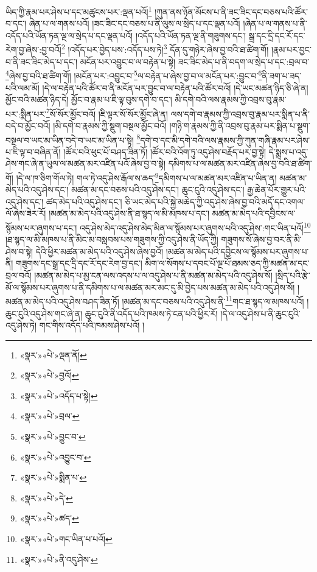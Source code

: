 ཡིད་ཀྱི་རྣམ་པར་ཤེས་པ་དང་མཚུངས་པར་:ལྡན་པའོ།\footnote{«སྣར་»«པེ་»ལྡན་ནོ།} །ཀུན་ནས་ཉོན་མོངས་པ་ནི་ཟང་ཟིང་དང་བཅས་པའི་ཚོར་བ་དང་། ཞེན་པ་ལ་གནས་པའོ། །ཟང་ཟིང་དང་བཅས་པ་ནི་ལུས་ལ་སྲེད་པ་དང་ལྡན་པའོ། །ཞེན་པ་ལ་གནས་པ་ནི་འདོད་པའི་ཡོན་ཏན་ལྔ་ལ་སྲེད་པ་དང་ལྡན་པའོ། །འདོད་པའི་ཡོན་ཏན་ལྔ་ནི་གཟུགས་དང་། སྒྲ་དང་དྲི་དང་རོ་དང་རེག་བྱ་ཞེས་:བྱ་བའོ།\footnote{«སྣར་»«པེ་»བྱའོ།} །འདོད་པར་བྱེད་པས་:འདོད་པས་ཏེ།\footnote{«སྣར་»«པེ་»འདོད་པ་སྟེ།} དོན་དུ་གཉེར་ཞེས་བྱ་བའི་ཐ་ཚིག་གོ། །རྣམ་པར་བྱང་བ་ནི་ཟང་ཟིང་མེད་པ་དང་། མངོན་པར་འབྱུང་བ་ལ་བརྟེན་པ་སྟེ། ཟང་ཟིང་མེད་པ་ནི་བདག་ལ་སྲེད་པ་དང་:བྲལ་བ་\footnote{«སྣར་»«པེ་»བྲལ་}ཞེས་བྱ་བའི་ཐ་ཚིག་གོ། །མངོན་པར་:འབྱུང་བ་\footnote{«སྣར་»«པེ་»བྱུང་བ་}ལ་བརྟེན་པ་ཞེས་བྱ་བ་ལ་མངོན་པར་:བྱུང་བ་\footnote{«སྣར་»«པེ་»འབྱུང་བ་}ནི་ཟག་པ་ཟད་པའི་ལམ་མོ། །དེ་ལ་བརྟེན་པའི་ཚོར་བ་ནི་མངོན་པར་བྱུང་བ་ལ་བརྟེན་པའི་ཚོར་བའོ། །དེ་ཡང་མཚན་ཉིད་ཅི་ཞེ་ན། མྱོང་བའི་མཚན་ཉིད་དེ། མྱོང་བ་རྣམ་པ་ཇི་ལྟ་བུས་དགེ་བ་དང་། མི་དགེ་བའི་ལས་རྣམས་ཀྱི་འབྲས་བུ་རྣམ་པར་:སྨིན་པར་\footnote{«སྣར་»«པེ་»སྨིན་པ་}སོ་སོར་མྱོང་བའོ། །ཇི་ལྟར་སོ་སོར་མྱོང་ཞེ་ན། ལས་དགེ་བ་རྣམས་ཀྱི་འབྲས་བུ་རྣམ་པར་སྨིན་པ་ནི་བདེ་བ་མྱོང་བའོ། །མི་དགེ་བ་རྣམས་ཀྱི་སྡུག་བསྔལ་མྱོང་བའོ། །གཉི་ག་རྣམས་ཀྱི་ནི་འབྲས་བུ་རྣམ་པར་སྨིན་པ་སྡུག་བསྔལ་བ་ཡང་མ་ཡིན་བདེ་བ་ཡང་མ་ཡིན་པ་སྟེ། \footnote{«སྣར་»«པེ་»དེ་}དགེ་བ་དང་མི་དགེ་བའི་ལས་རྣམས་ཀྱི་ཀུན་གཞི་རྣམ་པར་ཤེས་པ་ཇི་ལྟ་བ་བཞིན་ནོ། །ཚོར་བའི་ཕུང་པོ་བཤད་ཟིན་ཏོ། །ཚོར་བའི་འོག་ཏུ་འདུ་ཤེས་བརྗོད་པར་བྱ་སྟེ། དེ་སྨྲས་པ་འདུ་ཤེས་གང་ཞེ་ན་ཡུལ་ལ་མཚན་མར་འཛིན་པའོ་ཞེས་བྱ་བ་སྟེ། དམིགས་པ་ལ་མཚན་མར་འཛིན་ཞེས་བྱ་བའི་ཐ་ཚིག་གོ། །དེ་ལ་ཁ་ཅིག་གོལ་ཏེ། གལ་ཏེ་འདུ་ཤེས་རྒོལ་ས་ཆད་\footnote{«སྣར་»«པེ་»ཚད་}དམིགས་པ་ལ་མཚན་མར་འཛིན་པ་ཡིན་ན། མཚན་མ་མེད་པའི་འདུ་ཤེས་དང་། མཚན་མ་དང་བཅས་པའི་འདུ་ཤེས་དང་། ཆུང་ངུའི་འདུ་ཤེས་དང་། རྒྱ་ཆེན་པོར་གྱུར་པའི་འདུ་ཤེས་དང་། ཚད་མེད་པའི་འདུ་ཤེས་དང་། ཅི་ཡང་མེད་པའི་སྐྱེ་མཆེད་ཀྱི་འདུ་ཤེས་ཞེས་བྱ་བའི་མདོ་དང་འགལ་ལོ་ཞེས་ཟེར་རོ། །མཚན་མ་མེད་པའི་འདུ་ཤེས་ནི་ཐ་སྙད་ལ་མི་མཁས་པ་དང་། མཚན་མ་མེད་པའི་དབྱིངས་ལ་སྙོམས་པར་ཞུགས་པ་དང་། འདུ་ཤེས་མེད་འདུ་ཤེས་མེད་མིན་ལ་སྙོམས་པར་ཞུགས་པའི་འདུ་ཤེས་:གང་ཡིན་པའོ།\footnote{«སྣར་»«པེ་»གང་ཡིན་པ་པའོ།} །ཐ་སྙད་ལ་མི་མཁས་པ་ནི་མིང་མ་བསླབས་པས་གཟུགས་ཀྱི་འདུ་ཤེས་ནི་ཡོད་ཀྱི། གཟུགས་སོ་ཞེས་བྱ་བར་ནི་མི་ཤེས་བ་སྟེ། དེའི་ཕྱིར་མཚན་མ་མེད་པའི་འདུ་ཤེས་ཞེས་བྱའོ། །མཚན་མ་མེད་པའི་དབྱིངས་ལ་སྙོམས་པར་ཞུགས་པ་ནི། གཟུགས་དང་སྒྲ་དང་དྲི་དང་རོ་དང་རེག་བྱ་དང་། མིག་ལ་སོགས་པ་དབང་པོ་ལྔ་པོ་ཐམས་ཅད་ཀྱི་མཚན་མ་དང་བྲལ་བའོ། །མཚན་མ་མེད་པ་མྱ་ངན་ལས་འདས་པ་ལ་འདུ་ཤེས་པ་ནི་མཚན་མ་མེད་པའི་འདུ་ཤེས་སོ། །སྲིད་པའི་རྩེ་མོ་ལ་སྙོམས་པར་ཞུགས་པ་ནི་དམིགས་པ་ལ་མཚན་མར་མང་དུ་མི་བྱེད་པས་མཚན་མ་མེད་པའི་འདུ་ཤེས་སོ། །མཚན་མ་མེད་པའི་འདུ་ཤེས་བཤད་ཟིན་ཏོ། །མཚན་མ་དང་བཅས་པའི་འདུ་ཤེས་ནི་\footnote{«སྣར་»«པེ་»ནི་འདུ་ཤེས་}གང་ཐ་སྙད་ལ་མཁས་པའོ། །ཆུང་ངུའི་འདུ་ཤེས་གང་ཞེ་ན། ཆུང་ངུའི་ནི་འདོད་པའི་ཁམས་ཏེ་ངན་པའི་ཕྱིར་རོ། །དེ་ལ་འདུ་ཤེས་པ་ནི་ཆུང་ངུའི་འདུ་ཤེས་ཏེ། གང་གིས་འདོད་པའི་ཁམས་ཤེས་པའོ། །
